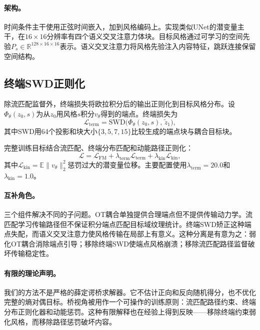 ﻿\documentclass[letterpaper]{article}
\begin{document}
\paragraph{架构。}
时间条件主干使用正弦时间嵌入，加到风格编码上。实现类似UNet的潜变量主干，在$16\times16$分辨率有四个语义交叉注意力体块。目标风格通过可学习的空间先验$P_s\in\mathbb{R}^{128\times16\times16}$表示。语义交叉注意力将风格先验注入内容特征，跳跃连接保留空间结构。

\subsection{终端SWD正则化}
除流匹配监督外，终端损失将欧拉积分后的输出正则化到目标风格分布。设$\Phi_\theta(z_0,s)$为从$z_0$用风格$s$积分$v_\theta$得到的端点。终端损失为
\begin{equation}
    \mathcal{L}_{\mathrm{term}} = \mathrm{SWD}\bigl(\Phi_\theta(z_0,s),\,\tilde{z}_1\bigr),
\end{equation}
其中SWD用64个投影和块大小$\{3,5,7,15\}$比较生成的端点块与耦合目标块。

完整训练目标结合流匹配、终端分布匹配和动能路径正则化：
\begin{equation}
    \mathcal{L} = \mathcal{L}_{\mathrm{FM}} + \lambda_{\mathrm{term}}\mathcal{L}_{\mathrm{term}} + \lambda_{\mathrm{kin}}\mathcal{L}_{\mathrm{kin}},
\end{equation}
其中$\mathcal{L}_{\mathrm{kin}} = \mathbb{E}\|v_\theta\|_2^2$惩罚过大的潜变量位移。主要配置使用$\lambda_{\mathrm{term}}=20.0$和$\lambda_{\mathrm{kin}}=1.0$。

\paragraph{互补角色。}
三个组件解决不同的子问题。OT耦合单独提供合理端点但不提供传输动力学。流匹配学习传输路径但不保证积分端点匹配目标域纹理统计。终端SWD矫正这种端点失配，而语义交叉注意力使风格传输在局部上有意义。这种分离是有意为之：弱化OT耦合消除端点引导；移除终端SWD使端点风格崩溃；移除流匹配路径监督破坏传输稳定性。

\paragraph{有限的理论声明。}
我们的方法不是严格的薛定谔桥求解器。它不估计正向和反向随机得分，也不优化完整的熵对偶目标。桥视角被用作一个可操作的训练原则：流匹配路径约束、终端分布正则化器和动能惩罚。这种有限解释也在经验上得到反映——移除终端约束弱化风格，而移除路径惩罚破坏内容。
\end{document}
